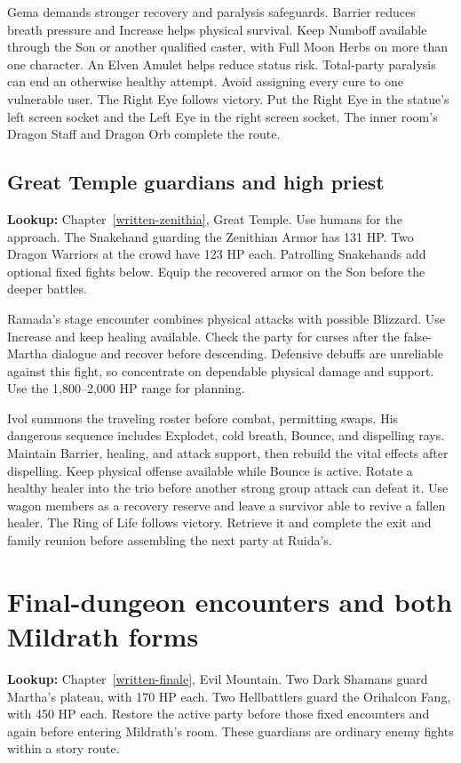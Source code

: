Gema demands stronger recovery and paralysis safeguards. Barrier reduces breath pressure and Increase helps physical survival. Keep Numboff available through the Son or another qualified caster, with Full Moon Herbs on more than one character. An Elven Amulet helps reduce status risk. Total-party paralysis can end an otherwise healthy attempt. Avoid assigning every cure to one vulnerable user. The Right Eye follows victory. Put the Right Eye in the statue's left screen socket and the Left Eye in the right screen socket. The inner room's Dragon Staff and Dragon Orb complete the route.

\subsection{Great Temple guardians and high priest}
\textbf{Lookup:} Chapter~\ref{written-zenithia}, Great Temple. Use humans for the approach. The Snakehand guarding the Zenithian Armor has 131 HP. Two Dragon Warriors at the crowd have 123 HP each. Patrolling Snakehands add optional fixed fights below. Equip the recovered armor on the Son before the deeper battles.

Ramada's stage encounter combines physical attacks with possible Blizzard. Use Increase and keep healing available. Check the party for curses after the false-Martha dialogue and recover before descending. Defensive debuffs are unreliable against this fight, so concentrate on dependable physical damage and support. Use the 1,800--2,000 HP range for planning.

Ivol summons the traveling roster before combat, permitting swaps. His dangerous sequence includes Explodet, cold breath, Bounce, and dispelling rays. Maintain Barrier, healing, and attack support, then rebuild the vital effects after dispelling. Keep physical offense available while Bounce is active. Rotate a healthy healer into the trio before another strong group attack can defeat it. Use wagon members as a recovery reserve and leave a survivor able to revive a fallen healer. The Ring of Life follows victory. Retrieve it and complete the exit and family reunion before assembling the next party at Ruida's.

\section{Final-dungeon encounters and both Mildrath forms}
\textbf{Lookup:} Chapter~\ref{written-finale}, Evil Mountain. Two Dark Shamans guard Martha's plateau, with 170 HP each. Two Hellbattlers guard the Orihalcon Fang, with 450 HP each. Restore the active party before those fixed encounters and again before entering Mildrath's room. These guardians are ordinary enemy fights within a story route.

